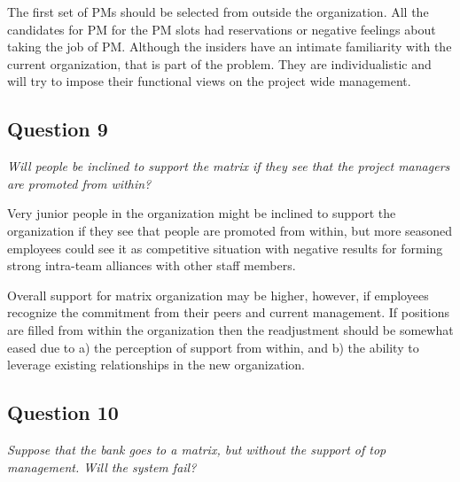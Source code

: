\documentclass[letterpaper,10pt]{article}
\begin{document}
The first set of PMs should be selected from outside the organization.  All the candidates for PM for the PM slots had reservations or negative feelings about taking the job of PM.  Although the insiders have an intimate familiarity with the current organization, that is part of the problem.  They are individualistic and will try to impose their functional views on the project wide management.  

\subsection{Question 9}
\emph{Will people be inclined to support the matrix if they see that the project managers are promoted from within?}\vspace*{1em}

Very junior people in the organization might be inclined to support the organization if they see that people are promoted from within, but more seasoned employees could see it as competitive situation with negative results for forming strong intra-team alliances with other staff members.

Overall support for matrix organization may be higher, however, if employees recognize the commitment from their peers and current management.  If positions are filled from within the organization then the readjustment should be somewhat eased due to a) the perception of support from within, and b) the ability to leverage existing relationships in the new organization.

\subsection{Question 10}
\emph{Suppose that the bank goes to a matrix, but without the support of top management.  Will the system fail?}\vspace*{1em}
\end{document}
